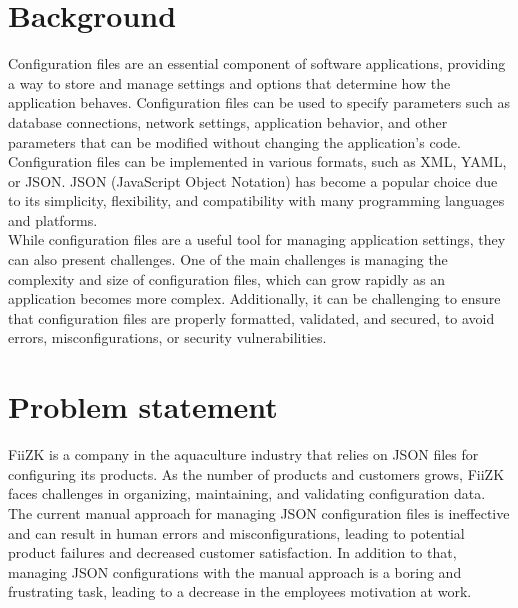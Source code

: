 
\section{Background}

Configuration files are an essential component of software applications, providing a way to store and manage settings and options that determine how the application behaves. Configuration files can be used to specify parameters such as database connections, network settings, application behavior, and other parameters that can be modified without changing the application's code. \\

\noindent
Configuration files can be implemented in various formats, such as XML, YAML, or JSON. JSON (JavaScript Object Notation) has become a popular choice due to its simplicity, flexibility, and compatibility with many programming languages and platforms. \\

\noindent
While configuration files are a useful tool for managing application settings, they can also present challenges. One of the main challenges is managing the complexity and size of configuration files, which can grow rapidly as an application becomes more complex. Additionally, it can be challenging to ensure that configuration files are properly formatted, validated, and secured, to avoid errors, misconfigurations, or security vulnerabilities. \\


\section{Problem statement}

FiiZK is a company in the aquaculture industry that relies on JSON files for configuring its products. As the number of products and customers grows, FiiZK faces challenges in organizing, maintaining, and validating configuration data. The current manual approach for managing JSON configuration files is ineffective and can result in human errors and misconfigurations, leading to potential product failures and decreased customer satisfaction. In addition to that, managing JSON configurations with the manual approach is a boring and frustrating task, leading to a decrease in the employees motivation at work. \\

